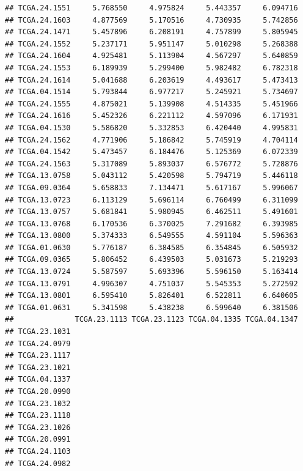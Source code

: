 \documentclass[UTF8]{beamer}\usepackage[]{graphicx}\usepackage[]{color}
\makeatletter
\newenvironment{kframe}{%
 \def\at@end@of@kframe{}%
 \ifinner\ifhmode%
  \def\at@end@of@kframe{\end{minipage}}%
  \begin{minipage}{\columnwidth}%
 \fi\fi%
 \def\FrameCommand##1{\hskip\@totalleftmargin \hskip-\fboxsep
 \colorbox{shadecolor}{##1}\hskip-\fboxsep
     \hskip-\linewidth \hskip-\@totalleftmargin \hskip\columnwidth}%
 \MakeFramed {\advance\hsize-\width
   \@totalleftmargin\z@ \linewidth\hsize
   \@setminipage}}%
 {\par\unskip\endMakeFramed%
 \at@end@of@kframe}
\newenvironment{knitrout}{}{} %
\makeatother
\begin{document}
\begin{frame}[fragile]
\begin{knitrout}
\begin{kframe}
\begin{verbatim}
## TCGA.24.1551     5.768550     4.975824     5.443357     6.094716
## TCGA.24.1603     4.877569     5.170516     4.730935     5.742856
## TCGA.24.1471     5.457896     6.208191     4.757899     5.805945
## TCGA.24.1552     5.237171     5.951147     5.010298     5.268388
## TCGA.24.1604     4.925481     5.113904     4.567297     5.640859
## TCGA.24.1553     6.189939     5.299400     5.982482     6.782318
## TCGA.24.1614     5.041688     6.203619     4.493617     5.473413
## TCGA.04.1514     5.793844     6.977217     5.245921     5.734697
## TCGA.24.1555     4.875021     5.139908     4.514335     5.451966
## TCGA.24.1616     5.452326     6.221112     4.597096     6.171931
## TCGA.04.1530     5.586820     5.332853     6.420440     4.995831
## TCGA.24.1562     4.771906     5.186842     5.745919     4.704114
## TCGA.04.1542     5.473457     6.184476     5.125369     6.072339
## TCGA.24.1563     5.317089     5.893037     6.576772     5.728876
## TCGA.13.0758     5.043112     5.420598     5.794719     5.446118
## TCGA.09.0364     5.658833     7.134471     5.617167     5.996067
## TCGA.13.0723     6.113129     5.696114     6.760499     6.311099
## TCGA.13.0757     5.681841     5.980945     6.462511     5.491601
## TCGA.13.0768     6.170536     6.370025     7.291682     6.393985
## TCGA.13.0800     5.374333     6.549555     4.591104     5.596363
## TCGA.01.0630     5.776187     6.384585     6.354845     6.505932
## TCGA.09.0365     5.806452     6.439503     5.031673     5.219293
## TCGA.13.0724     5.587597     5.693396     5.596150     5.163414
## TCGA.13.0791     4.996307     4.751037     5.545353     5.272592
## TCGA.13.0801     6.595410     5.826401     6.522811     6.640605
## TCGA.01.0631     5.341598     5.438238     6.599640     6.381506
##              TCGA.23.1113 TCGA.23.1123 TCGA.04.1335 TCGA.04.1347
## TCGA.23.1031                                                    
## TCGA.24.0979                                                    
## TCGA.23.1117                                                    
## TCGA.23.1021                                                    
## TCGA.04.1337                                                    
## TCGA.20.0990                                                    
## TCGA.23.1032                                                    
## TCGA.23.1118                                                    
## TCGA.23.1026                                                    
## TCGA.20.0991                                                    
## TCGA.24.1103                                                    
## TCGA.24.0982                                                    

\end{verbatim}
\end{kframe}
\end{knitrout}
\end{frame}
\end{document}
